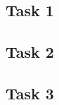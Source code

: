 \documentclass[a4paper, titlepage]{article}
\begin{document}
\begin{figure}[h!]
\center
\label{fig:exampleLable}
\end{figure}



\subsection{Task 1}

\clearpage

\subsection{Task 2}

\clearpage

\subsection{Task 3}

\clearpage
\end{document}
